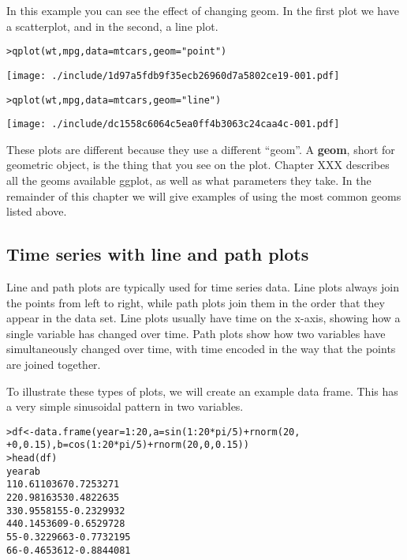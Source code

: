 In this example you can see the effect of changing geom.  In the first plot we have a scatterplot, and in the second, a line plot.

\begin{alltt}
> qplot(wt, mpg, data = mtcars, geom = "point")
\end{alltt}
\texttt{[image: ./include/1d97a5fdb9f35ecb26960d7a5802ce19-001.pdf]}
\begin{alltt}

> qplot(wt, mpg, data = mtcars, geom = "line")
\end{alltt}
\texttt{[image: ./include/dc1558c6064c5ea0ff4b3063c24caa4c-001.pdf]}
\begin{alltt}

\end{alltt}


These plots are different because they use a different ``geom''.  A {\bf geom}, short for geometric object, is the thing that you see on the plot.  Chapter XXX describes all the geoms available ggplot, as well as what parameters they take.  In the remainder of this chapter we will give examples of using the most common geoms listed above.

\subsection{Time series with line and path plots}\label{sub:line_plot}

Line and path plots are typically used for time series data.  Line plots always join the points from left to right, while path plots join them in the order that they appear in the data set.  Line plots usually have time on the x-axis, showing how a single variable has changed over time.  Path plots show how two variables have simultaneously changed over time, with time encoded in the way that the points are joined together.

To illustrate these types of plots, we will create an example data frame.  This has a very simple sinusoidal pattern in two variables.

\begin{alltt}
> df <- data.frame(year = 1:20, a = sin(1:20 * pi/5) + rnorm(20, 
+     0, 0.15), b = cos(1:20 * pi/5) + rnorm(20, 0, 0.15))
> head(df)
  year          a          b
1    1  0.6110367  0.7253271
2    2  0.9816353  0.4822635
3    3  0.9558155 -0.2329932
4    4  0.1453609 -0.6529728
5    5 -0.3229663 -0.7732195
6    6 -0.4653612 -0.8844081

\end{alltt}

